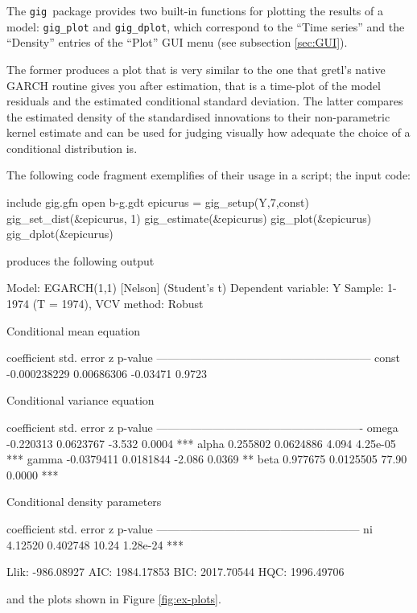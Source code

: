 \documentclass[a4paper,11pt]{article}
\newcommand{\app}[1]{\textsf{#1}}
\newcounter{script}[section]
\newcommand{\gig}{\texttt{gig}}
\begin{document}
The \gig\ package provides two built-in functions for plotting the
results of a model: \texttt{gig\_plot} and \texttt{gig\_dplot}, which
correspond to the ``Time series'' and the ``Density'' entries of the
``Plot'' GUI menu (see subsection \ref{sec:GUI}). 

The former produces a plot that is very similar to the one that
\app{gretl}'s native GARCH routine gives you after estimation, that is
a time-plot of the model residuals and the estimated conditional
standard deviation. The latter compares the estimated density of the
standardised innovations to their non-parametric kernel estimate and
can be used for judging visually how adequate the choice of a
conditional distribution is.

The following code
fragment exemplifies of their usage in a script; the input code:

\begin{code}
include gig.gfn
open b-g.gdt
epicurus = gig_setup(Y,7,const)
gig_set_dist(&epicurus, 1)
gig_estimate(&epicurus)
gig_plot(&epicurus)
gig_dplot(&epicurus)  
\end{code}
produces the following output
\begin{code}
Model: EGARCH(1,1) [Nelson] (Student's t)
Dependent variable: Y
Sample: 1-1974 (T = 1974), VCV method: Robust

    Conditional mean equation

             coefficient    std. error      z       p-value
  ---------------------------------------------------------
  const      -0.000238229   0.00686306   -0.03471   0.9723 

    Conditional variance equation

             coefficient   std. error     z      p-value 
  -------------------------------------------------------
  omega      -0.220313     0.0623767    -3.532   0.0004   ***
  alpha       0.255802     0.0624886     4.094   4.25e-05 ***
  gamma      -0.0379411    0.0181844    -2.086   0.0369   **
  beta        0.977675     0.0125505    77.90    0.0000   ***

    Conditional density parameters

             coefficient   std. error     z     p-value 
  ------------------------------------------------------
  ni           4.12520      0.402748    10.24   1.28e-24 ***

	Llik:   -986.08927	 AIC:   1984.17853
	BIC:    2017.70544	 HQC:   1996.49706
\end{code}
and the plots shown in Figure \ref{fig:ex-plots}.
\end{document}

